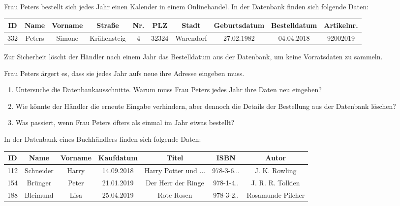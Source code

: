 \documentclass[10pt, a5paper,landscape]{scrartcl}
\begin{document}
\clearpage
\ReiheTitel

Frau Peters bestellt sich jedes Jahr einen Kalender in einem Onlinehandel. In der Datenbank finden sich folgende Daten:

{\footnotesize
\begin{tabular}{|*{10}{c|}}\hline
	\rowcolor{ngb.tabelle.kopf.hg} ID & Name & Vorname & Straße & Nr. & PLZ & Stadt & Geburtsdatum & Bestelldatum & Artikelnr. \\ \hline
	332 & Peters & Simone & Krähensteig & 4 & 32324 & Warendorf & 27.02.1982 & 04.04.2018 & 92002019 \\\hline
\end{tabular}}

Zur Sicherheit löscht der Händler nach einem Jahr das Bestelldatum aus der Datenbank, um keine Vorratsdaten zu sammeln.

Frau Peters ärgert es, dass sie jedes Jahr aufs neue ihre Adresse eingeben muss.

\vspace{1em}
\begin{aufgabe}
\begin{enumerate}
	\item Untersuche die Datenbankausschnitte. Warum muss Frau Peters jedes Jahr ihre Daten neu eingeben?
	\item Wie könnte der Händler die erneute Eingabe verhindern, aber dennoch die Details der Bestellung aus der Datenbank löschen?
	\item Was passiert, wenn Frau Peters öfters als einmal im Jahr etwas bestellt? 
\end{enumerate}
\end{aufgabe}

\clearpage
\ReiheTitel

In der Datenbank eines Buchhändlers finden sich folgende Daten:

{\footnotesize
\begin{tabular}{|*{7}{c|}}\hline
	\rowcolor{ngb.tabelle.kopf.hg} ID & Name & Vorname & Kaufdatum & Titel & ISBN & Autor\\ \hline
	112 & Schneider & Harry & 14.09.2018 & Harry Potter und ... & 978-3-6... & J. K. Rowling \\\hline
	154 & Brünger & Peter & 21.01.2019 & Der Herr der Ringe & 978-1-4.. & J. R. R. Tolkien \\\hline
	188 & Bleimund & Lisa & 25.04.2019 & Rote Rosen & 978-3-2.. & Rosamunde Pilcher \\\hline
\end{tabular}}
\end{document}
